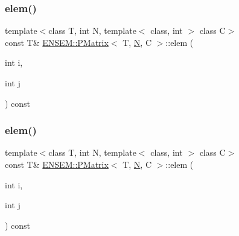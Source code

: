 \mbox{\label{classENSEM_1_1PMatrix_a5cacb33b2dcd4c33a9d3a135528a8bdf}} 
\subsubsection{\texorpdfstring{elem()}{elem()}\hspace{0.1cm}{\footnotesize\ttfamily [5/6]}}
{\footnotesize\ttfamily template$<$class T, int N, template$<$ class, int $>$ class C$>$ \\
const T\& \mbox{\hyperlink{classENSEM_1_1PMatrix}{E\+N\+S\+E\+M\+::\+P\+Matrix}}$<$ T, \mbox{\hyperlink{adat__devel_2lib_2hadron_2operator__name__util_8cc_a7722c8ecbb62d99aee7ce68b1752f337}{N}}, C $>$\+::elem (\begin{DoxyParamCaption}\item[{int}]{i,  }\item[{int}]{j }\end{DoxyParamCaption}) const\hspace{0.3cm}{\ttfamily [inline]}}

\mbox{\label{classENSEM_1_1PMatrix_a5cacb33b2dcd4c33a9d3a135528a8bdf}} 
\subsubsection{\texorpdfstring{elem()}{elem()}\hspace{0.1cm}{\footnotesize\ttfamily [6/6]}}
{\footnotesize\ttfamily template$<$class T, int N, template$<$ class, int $>$ class C$>$ \\
const T\& \mbox{\hyperlink{classENSEM_1_1PMatrix}{E\+N\+S\+E\+M\+::\+P\+Matrix}}$<$ T, \mbox{\hyperlink{adat__devel_2lib_2hadron_2operator__name__util_8cc_a7722c8ecbb62d99aee7ce68b1752f337}{N}}, C $>$\+::elem (\begin{DoxyParamCaption}\item[{int}]{i,  }\item[{int}]{j }\end{DoxyParamCaption}) const\hspace{0.3cm}{\ttfamily [inline]}}

